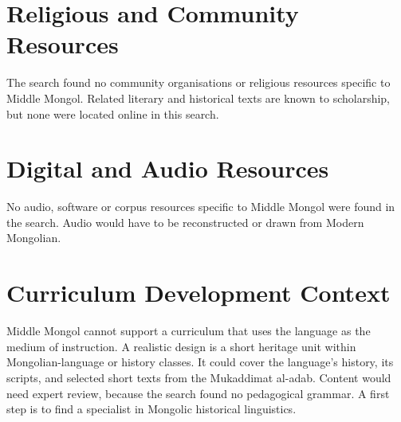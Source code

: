 \documentclass[12pt]{article}
\begin{document}
\section{Religious and Community Resources}
The search found no community organisations or religious resources specific to Middle Mongol. Related literary and historical texts are known to scholarship, but none were located online in this search.

\section{Digital and Audio Resources}
No audio, software or corpus resources specific to Middle Mongol were found in the search. Audio would have to be reconstructed or drawn from Modern Mongolian.

\section{Curriculum Development Context}
Middle Mongol cannot support a curriculum that uses the language as the medium of instruction. A realistic design is a short heritage unit within Mongolian-language or history classes. It could cover the language's history, its scripts, and selected short texts from the Mukaddimat al-adab. Content would need expert review, because the search found no pedagogical grammar. A first step is to find a specialist in Mongolic historical linguistics.
\end{document}
